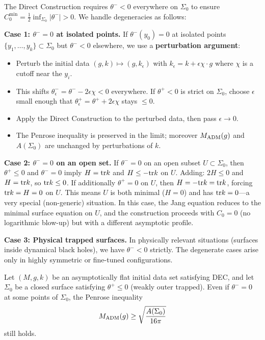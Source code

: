 \begin{remark}\label{rem:DegenerateTrappedCase}
The Direct Construction requires $\theta^- < 0$ everywhere on $\Sigma_0$ to ensure $C_0^{\min} = \frac{1}{2}\inf_{\Sigma_0}|\theta^-| > 0$. We handle degeneracies as follows:

\textbf{Case 1: $\theta^- = 0$ at isolated points.} If $\theta^-(y_0) = 0$ at isolated points $\{y_1, \ldots, y_k\} \subset \Sigma_0$ but $\theta^- < 0$ elsewhere, we use a \textbf{perturbation argument}:
\begin{itemize}
    \item Perturb the initial data $(g, k) \mapsto (g, k_\epsilon)$ with $k_\epsilon = k + \epsilon \chi \cdot g$ where $\chi$ is a cutoff near the $y_i$.
    \item This shifts $\theta^-_\epsilon = \theta^- - 2\epsilon\chi < 0$ everywhere. If $\theta^+ < 0$ is strict on $\Sigma_0$, choose $\epsilon$ small enough that $\theta^+_\epsilon = \theta^+ + 2\epsilon\chi$ stays $\le 0$.
    \item Apply the Direct Construction to the perturbed data, then pass $\epsilon \to 0$.
    \item The Penrose inequality is preserved in the limit; moreover $M_{\mathrm{ADM}}(g)$ and $A(\Sigma_0)$ are unchanged by perturbations of $k$.
\end{itemize}

\textbf{Case 2: $\theta^- = 0$ on an open set.} If $\theta^- = 0$ on an open subset $U \subset \Sigma_0$, then $\theta^+ \le 0$ and $\theta^- = 0$ imply $H = \mathrm{tr} k$ and $H \le -\mathrm{tr} k$ on $U$. Adding: $2H \le 0$ and $H = \mathrm{tr} k$, so $\mathrm{tr} k \le 0$. If additionally $\theta^+ = 0$ on $U$, then $H = -\mathrm{tr} k = \mathrm{tr} k$, forcing $\mathrm{tr} k = H = 0$ on $U$. This means $U$ is both minimal ($H = 0$) and has $\mathrm{tr} k = 0$---a very special (non-generic) situation. In this case, the Jang equation reduces to the minimal surface equation on $U$, and the construction proceeds with $C_0 = 0$ (no logarithmic blow-up) but with a different asymptotic profile.

\textbf{Case 3: Physical trapped surfaces.} In physically relevant situations (surfaces inside dynamical black holes), we have $\theta^- < 0$ strictly. The degenerate cases arise only in highly symmetric or fine-tuned configurations.
\end{remark}

\begin{proposition}\label{prop:DegeneratePI}
Let $(M, g, k)$ be an asymptotically flat initial data set satisfying DEC, and let $\Sigma_0$ be a closed surface satisfying $\theta^+ \le 0$ (weakly outer trapped). Even if $\theta^- = 0$ at some points of $\Sigma_0$, the Penrose inequality
\[
    M_{\mathrm{ADM}}(g) \ge \sqrt{\frac{A(\Sigma_0)}{16\pi}}
\]
still holds.
\end{proposition}


